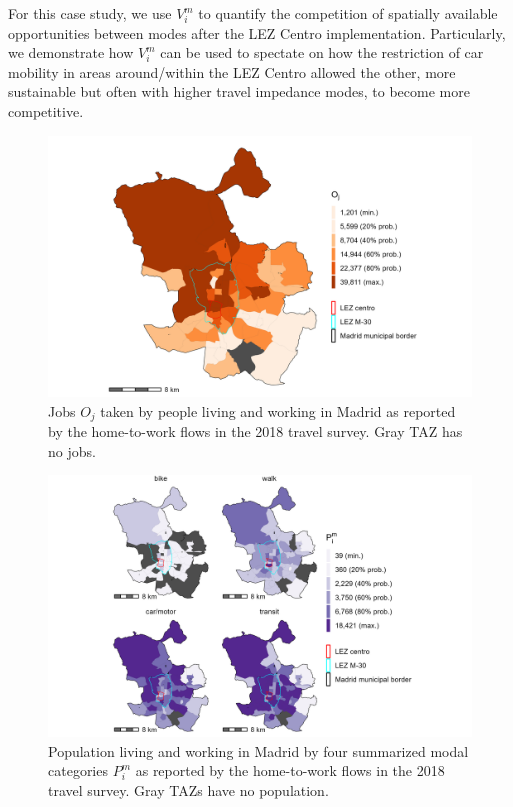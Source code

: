 \documentclass[10pt,letterpaper]{article}
\begin{document}
For this case study, we use \(V_i^m\) to quantify the competition of
spatially available opportunities between modes after the LEZ Centro
implementation. Particularly, we demonstrate how \(V_i^m\) can be used
to spectate on how the restriction of car mobility in areas
around/within the LEZ Centro allowed the other, more sustainable but
often with higher travel impedance modes, to become more competitive.

\begin{figure}

{\centering \includegraphics[width=1\linewidth]{images/i_jobs_zn208_plot} 

}

\caption{\label{fig:Fig2} Jobs $O_j$ taken by people living and working in Madrid as reported by the home-to-work flows in the 2018 travel survey. Gray TAZ has no jobs.}\label{fig:jobs-plot}
\end{figure}

\begin{figure}

{\centering \includegraphics[width=1\linewidth]{images/im_populations_zn208_plot} 

}

\caption{\label{fig:Fig3} Population living and working in Madrid by four summarized modal categories $P^m_i$ as reported by the home-to-work flows in the 2018 travel survey. Gray TAZs have no population.}\label{fig:pop-plot}
\end{figure}
\end{document}
